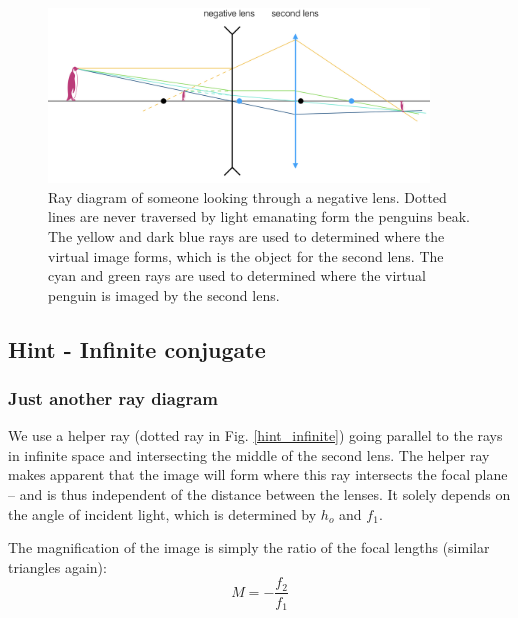 \documentclass[a4paper]{report}
\begin{document}
	\begin{figure}[h]
		\center
		\includegraphics[width=0.9\textwidth]{figures/negative_lens.png}
		\captionsetup{width=0.9\textwidth}
		\caption{Ray diagram of someone looking through a negative lens. Dotted lines are never traversed by light emanating form the penguins beak. The yellow and dark blue rays are used to determined where the virtual image forms, which is the object for the second lens. The cyan and green rays are used to determined where the virtual penguin is imaged by the second lens.}
		\label{fig:neglens}
	\end{figure}


    \clearpage


    \subsection{Hint - Infinite conjugate}
	\hypertarget{hintTo-infinite}{}

	\subsubsection{Just another ray diagram}
	We use a helper ray (dotted ray in Fig. \ref{hint_infinite}) going parallel to the rays in infinite space and intersecting the middle of the second lens.
	The helper ray makes apparent that the image will form where this ray intersects the focal plane -- and is thus independent of the distance between the lenses.
	It solely depends on the angle of incident light, which is determined by $h_o$ and $f_1$.

	The magnification of the image is simply the ratio of the focal lengths (similar triangles again):
	\begin{equation}
	M=-\frac{f_2}{f_1}
	\label{eq:magIC}
	\end{equation}
\end{document}
